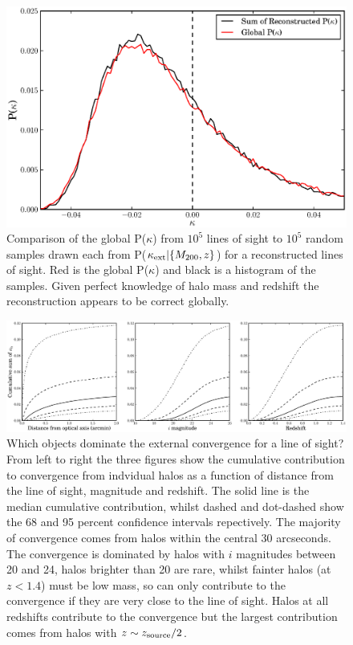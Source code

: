 \documentclass[useAMS,usenatbib]{mn2e}
\begin{document}
\begin{figure}
\includegraphics[width=\columnwidth]{figs/globaldist.eps}
\caption[magcut]{Comparison of the global P($\kappa$) from $10^{5}$ lines of sight to $10^{5}$ random samples drawn each from P($\kappa_{\rm ext}|\{M_{200},z\}$) for a reconstructed lines of sight. Red is the global P($\kappa$) and black is a histogram of the samples. Given perfect knowledge of halo mass and redshift the reconstruction appears to be correct globally.}
\label{fig:globaldist}
\end{figure}

\begin{figure}
\includegraphics[width=\textwidth]{figs/where_is_the_kappa.eps}
\caption[magcut]{Which objects dominate the external convergence for a line of sight? From left to right the three figures show the cumulative contribution to convergence from indvidual halos as a function of distance from the line of sight, magnitude and redshift. The solid line is the median cumulative contribution, whilst dashed and dot-dashed show the 68 and 95 percent confidence intervals repectively. The majority of convergence comes from halos within the central 30 arcseconds. The convergence is dominated by halos with $i$ magnitudes between 20 and 24, halos brighter than 20 are rare, whilst fainter halos (at $z<1.4$) must be low mass, so can only contribute to the convergence if they are very close to the line of sight. Halos at all redshifts contribute to the convergence but the largest contribution comes from halos with $z \sim z_{\rm source}/2$.}
\label{fig:where}
\end{figure}
\end{document}
